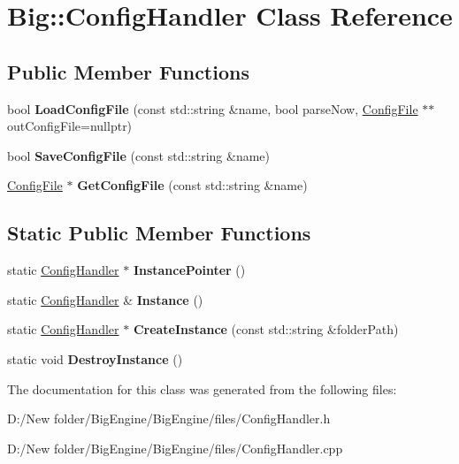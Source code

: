 \hypertarget{class_big_1_1_config_handler}{}\section{Big\+:\+:Config\+Handler Class Reference}
\label{class_big_1_1_config_handler}
\subsection*{Public Member Functions}
\begin{DoxyCompactItemize}
\item 
\mbox{\label{class_big_1_1_config_handler_a8a7a4eb8da2df0d1ac4f90cbd8aef6da}} 
bool {\bfseries Load\+Config\+File} (const std\+::string \&name, bool parse\+Now, \mbox{\hyperlink{class_big_1_1_config_file}{Config\+File}} $\ast$$\ast$out\+Config\+File=nullptr)
\item 
\mbox{\label{class_big_1_1_config_handler_aa77616ca500ac486d9fed385a2f7ae11}} 
bool {\bfseries Save\+Config\+File} (const std\+::string \&name)
\item 
\mbox{\label{class_big_1_1_config_handler_a215588d188c337e2438a03cec90a95c7}} 
\mbox{\hyperlink{class_big_1_1_config_file}{Config\+File}} $\ast$ {\bfseries Get\+Config\+File} (const std\+::string \&name)
\end{DoxyCompactItemize}
\subsection*{Static Public Member Functions}
\begin{DoxyCompactItemize}
\item 
\mbox{\label{class_big_1_1_config_handler_afc653f44af2de5a75afef23ff04d2605}} 
static \mbox{\hyperlink{class_big_1_1_config_handler}{Config\+Handler}} $\ast$ {\bfseries Instance\+Pointer} ()
\item 
\mbox{\label{class_big_1_1_config_handler_a9955c8effc678ac0fca9283d68a2fe7b}} 
static \mbox{\hyperlink{class_big_1_1_config_handler}{Config\+Handler}} \& {\bfseries Instance} ()
\item 
\mbox{\label{class_big_1_1_config_handler_a0bd69b6078fd09176494073713f6d914}} 
static \mbox{\hyperlink{class_big_1_1_config_handler}{Config\+Handler}} $\ast$ {\bfseries Create\+Instance} (const std\+::string \&folder\+Path)
\item 
\mbox{\label{class_big_1_1_config_handler_a4759867fa4a1eed58db3f95b7e638587}} 
static void {\bfseries Destroy\+Instance} ()
\end{DoxyCompactItemize}


The documentation for this class was generated from the following files\+:\begin{DoxyCompactItemize}
\item 
D\+:/\+New folder/\+Big\+Engine/\+Big\+Engine/files/Config\+Handler.\+h\item 
D\+:/\+New folder/\+Big\+Engine/\+Big\+Engine/files/Config\+Handler.\+cpp\end{DoxyCompactItemize}
